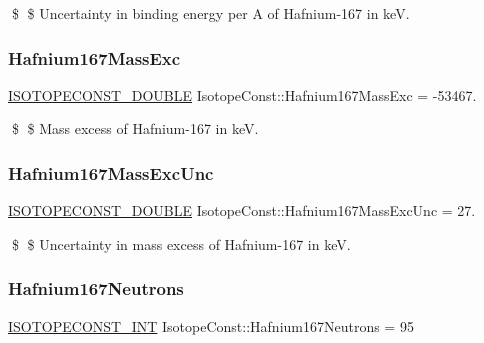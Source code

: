 \$ \$ Uncertainty in binding energy per A of Hafnium-\/167 in keV. \mbox{\label{group___isotope_const-_hafnium-_hf167_ga98b80de53603b18c87dd97b68d6c0e30}} 
\subsubsection{\texorpdfstring{Hafnium167\+Mass\+Exc}{Hafnium167MassExc}}
{\footnotesize\ttfamily \mbox{\hyperlink{group___isotope_const-_macros_ga8f45a7272ce02c0b4c65c44636ed719a}{I\+S\+O\+T\+O\+P\+E\+C\+O\+N\+S\+T\+\_\+\+D\+O\+U\+B\+LE}} Isotope\+Const\+::\+Hafnium167\+Mass\+Exc = -\/53467.}

\$ \$ Mass excess of Hafnium-\/167 in keV. \mbox{\label{group___isotope_const-_hafnium-_hf167_ga8ffee49b0a66d0ff36e3cdf81af7628e}} 
\subsubsection{\texorpdfstring{Hafnium167\+Mass\+Exc\+Unc}{Hafnium167MassExcUnc}}
{\footnotesize\ttfamily \mbox{\hyperlink{group___isotope_const-_macros_ga8f45a7272ce02c0b4c65c44636ed719a}{I\+S\+O\+T\+O\+P\+E\+C\+O\+N\+S\+T\+\_\+\+D\+O\+U\+B\+LE}} Isotope\+Const\+::\+Hafnium167\+Mass\+Exc\+Unc = 27.}

\$ \$ Uncertainty in mass excess of Hafnium-\/167 in keV. \mbox{\label{group___isotope_const-_hafnium-_hf167_gacfc5ad91e191ebcee959e41ee756e7f9}} 
\subsubsection{\texorpdfstring{Hafnium167\+Neutrons}{Hafnium167Neutrons}}
{\footnotesize\ttfamily \mbox{\hyperlink{group___isotope_const-_macros_ga5f18360b3e99483a35c32d789e62621c}{I\+S\+O\+T\+O\+P\+E\+C\+O\+N\+S\+T\+\_\+\+I\+NT}} Isotope\+Const\+::\+Hafnium167\+Neutrons = 95}

